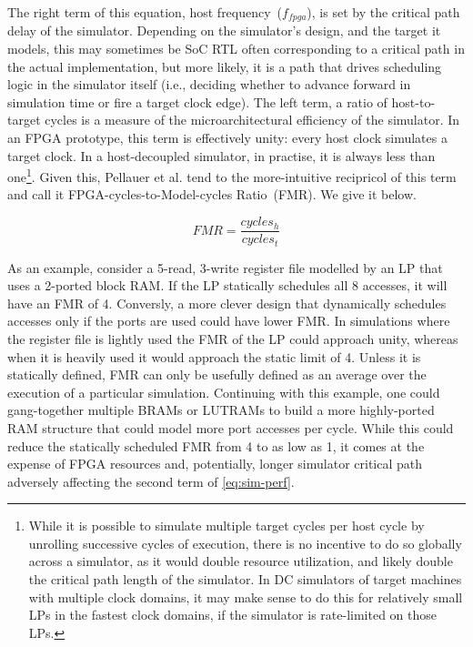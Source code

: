 The right term of this equation, host frequency~($f_{fpga}$), is set by the
critical path delay of the simulator. Depending on the simulator's design, and
the target it models, this may sometimes be SoC RTL often corresponding to a
critical path in the actual implementation, but more likely, it is a path that
drives scheduling logic in the simulator itself (i.e., deciding whether to
advance forward in simulation time or fire a target clock edge).
The left term, a ratio of host-to-target cycles is a measure of the
microarchitectural efficiency of the simulator. In an FPGA prototype, this term is
effectively unity: every host clock simulates a target clock. In
a host-decoupled simulator, in practise, it is always less than one\footnote{While it is possible to simulate multiple target cycles per
host cycle by unrolling successive cycles of execution, there is no incentive
to do so globally across a simulator, as it would double resource utilization,
and likely double the critical path length of the simulator. In DC simulators
of target machines with multiple clock domains, it may make sense to do this
for relatively small LPs in the fastest clock domains, if the simulator is
rate-limited on those LPs.}. Given this, Pellauer et al. tend to the
more-intuitive recipricol of this term and call it FPGA-cycles-to-Model-cycles
Ratio~(FMR). We give it below.

\begin{equation}
    FMR = \frac{cycles_{h}}{cycles_{t}}
\end{equation}\label{eq:fmr}

As an example, consider a 5-read, 3-write register file modelled by an LP that
uses a 2-ported block RAM. If the LP statically schedules all 8 accesses, it
will have an FMR of 4. Conversly, a more clever design that dynamically
schedules accesses only if the ports are used could have lower FMR. In
simulations where the register file is lightly used the FMR of the LP could
approach unity, whereas when it is heavily used it would approach the static
limit of 4. Unless it is statically defined, FMR can only be usefully defined
as an average over the execution of a particular simulation. Continuing with
this example, one could gang-together multiple BRAMs or LUTRAMs to build a more
highly-ported RAM structure that could model more port accesses per cycle.
While this could reduce the statically scheduled FMR from 4 to as low as 1, it
comes at the expense of FPGA resources and, potentially, longer simulator
critical path adversely affecting the second term of \ref{eq:sim-perf}.

